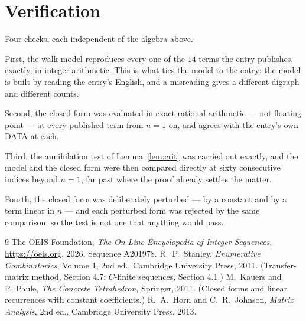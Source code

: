 \documentclass[11pt,a4paper]{article}
\theoremstyle{plain}
\theoremstyle{definition}
\begin{document}
\section{Verification}

Four checks, each independent of the algebra above.

First, the walk model reproduces every one of the $14$ terms the entry publishes,
exactly, in integer arithmetic. This is what ties the model to the entry: the model is built
by reading the entry's English, and a misreading gives a different digraph and different
counts.

Second, the closed form was evaluated in exact rational arithmetic --- not floating point ---
at every published term from $n=1$ on, and agrees with the entry's own DATA at each.

Third, the annihilation test of Lemma~\ref{lem:crit} was carried out exactly, and the model
and the closed form were then compared directly at sixty consecutive indices beyond
$n=1$, far past where the proof already settles the matter.

Fourth, the closed form was deliberately perturbed --- by a constant and by a term linear in
$n$ --- and each perturbed form was rejected by the same comparison, so the test is not one
that anything would pass.

\begin{thebibliography}{9}
 The OEIS Foundation, \emph{The On-Line Encyclopedia of Integer
Sequences}, \url{https://oeis.org}, 2026. Sequence A201978.
 R.~P.~Stanley, \emph{Enumerative Combinatorics}, Volume 1, 2nd ed.,
Cambridge University Press, 2011. (Transfer-matrix method, Section 4.7; $C$-finite sequences,
Section 4.1.)
 M.~Kauers and P.~Paule, \emph{The Concrete Tetrahedron}, Springer, 2011.
(Closed forms and linear recurrences with constant coefficients.)
 R.~A.~Horn and C.~R.~Johnson, \emph{Matrix Analysis}, 2nd ed., Cambridge
University Press, 2013.
\end{thebibliography}
\end{document}
